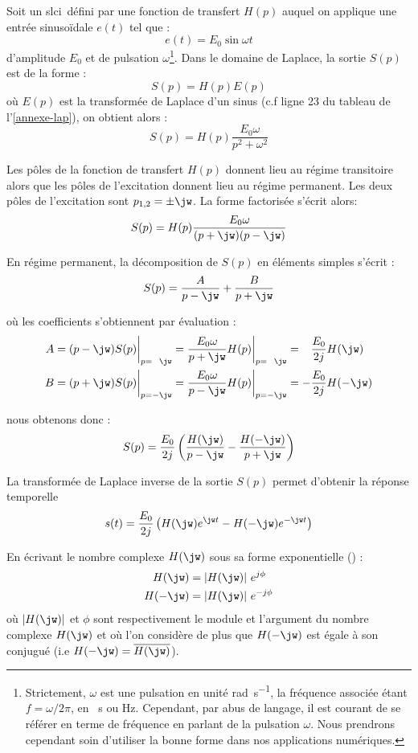 Soit un \gls{slci}~défini par une fonction de transfert $H(p)$ auquel on 
applique une entrée sinuso\"idale $e(t)$ tel que :
$$
e(t)=E_0\sin\omega t 
$$
d'amplitude $E_0$ et de pulsation $\omega$\footnote{Strictement, $\omega$ est 
une pulsation en unité \si{\radian\per\second}, la fréquence associée étant 
$f=\omega/2\pi$, en \si{\per\second} ou \si{\hertz}. Cependant, par abus de 
langage, il est courant de se référer en terme de fréquence en parlant de la 
pulsation $\omega$. Nous prendrons cependant soin d'utiliser la bonne forme 
dans nos applications numériques.}. Dans le domaine de Laplace, la sortie $S(p)$
est de la forme :
$$
S(p)=H(p)E(p)
$$
où $E(p)$ est la transformée de Laplace d'un sinus (c.f ligne 23 du tableau de 
l'\cref{annexe-lap}), on obtient alors :
$$
S(p)=H(p)\dfrac{E_0\omega}{p^2+\omega^2}
$$

Les pôles de la fonction de transfert $H(p)$ donnent lieu au 
régime transitoire alors que les pôles de l'excitation donnent 
lieu au régime permanent. 
Les deux pôles de l'excitation sont $p_{1,2}=\pm\jw$. La forme factorisée 
s'écrit alors:
$$
S(p)=H(p)\dfrac{E_0\omega}{(p+\jw)(p-\jw)}
$$

En régime permanent, la décomposition de $S(p)$ en éléments simples s'écrit :
$$
S(p)=\dfrac{A}{p-\jw} + \dfrac{B}{p+\jw}
$$

où les coefficients s'obtiennent par évaluation :
\begin{align*}
    A&=(p-\jw)S(p)\bigg|_{p=\hphantom{-}\jw}=
       \dfrac{E_0\omega}{p+\jw}H(p)\bigg|_{p=\hphantom{-}\jw}=
       \hphantom{-}\dfrac{E_0}{2j}H(\jw)\\
    B&=(p+\jw)S(p)\bigg|_{p=-\jw}=
       \dfrac{E_0\omega}{p-\jw}H(p)\bigg|_{p=-\jw}=
       -\dfrac{E_0}{2j}H(-\jw)
\end{align*}

nous obtenons donc :
$$
S(p)=\dfrac{E_0}{2j}\left(\dfrac{H(\jw)}{p-\jw}-\dfrac{H(-\jw)}{p+\jw} \right)
$$

La transformée de Laplace inverse de la sortie $S(p)$ permet d'obtenir la 
réponse temporelle 
$$
s(t)=\dfrac{E_0}{2j}\left(H(\jw)e^{\jw t}-H(-\jw)e^{-\jw t}\right)
$$

En écrivant le nombre complexe $H(\jw)$ sous sa forme exponentielle 
() :
\begin{align*}
    H(\jw)  &= |H(\jw)| e^{j\phi} \\
    H(-\jw) &= |H(\jw)| e^{-j\phi}
\end{align*}
où $|H(\jw)|$ et $\phi$ sont respectivement le module et l'argument du nombre
complexe $H(\jw)$ 
et où l'on considère de plus que $H(-\jw)$ est égale à son conjugué (i.e 
$H(-\jw)=\overline{H(\jw)}$).

